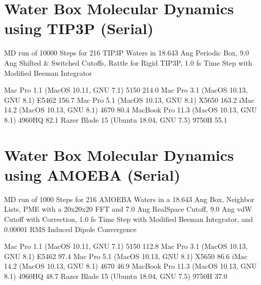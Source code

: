 \documentclass[letterpaper,11pt,english]{sphinxmanual}
\begin{document}
\section{Water Box Molecular Dynamics using TIP3P (Serial)}
\label{\detokenize{text/benchmarks:water-box-molecular-dynamics-using-tip3p-serial}}
MD run of 10000 Steps for 216 TIP3P Waters in 18.643 Ang Periodic Box, 9.0 Ang Shifted \& Switched Cutoffs, Rattle for Rigid TIP3P, 1.0 fs Time Step with Modified Beeman Integrator


\begin{sphinxVerbatim}[commandchars=\\\{\}]
Mac Pro 1.1 (MacOS 10.11, GNU 7.1)             5150               214.0
Mac Pro 3.1 (MacOS 10.13, GNU 8.1)            E5462               156.7
Mac Pro 5.1 (MacOS 10.13, GNU 8.1)            X5650               163.2
iMac 14.2 (MacOS 10.13, GNU 8.1)               4670                80.4
MacBook Pro 11.3 (MacOS 10.13, GNU 8.1)      4960HQ                82.1
Razer Blade 15 (Ubuntu 18.04, GNU 7.5)        9750H                55.1
\end{sphinxVerbatim}


\section{Water Box Molecular Dynamics using AMOEBA (Serial)}
\label{\detokenize{text/benchmarks:water-box-molecular-dynamics-using-amoeba-serial}}
MD run of 1000 Steps for 216 AMOEBA Waters in a 18.643 Ang Box, Neighbor Lists, PME with a 20x20x20 FFT and 7.0 Ang Real\sphinxhyphen{}Space Cutoff, 9.0 Ang vdW Cutoff with Correction, 1.0 fs Time Step with Modified Beeman Integrator, and 0.00001 RMS Induced Dipole Convergence


\begin{sphinxVerbatim}[commandchars=\\\{\}]
Mac Pro 1.1 (MacOS 10.11, GNU 7.1)             5150               112.8
Mac Pro 3.1 (MacOS 10.13, GNU 8.1)            E5462                97.4
Mac Pro 5.1 (MacOS 10.13, GNU 8.1)            X5650                86.6
iMac 14.2 (MacOS 10.13, GNU 8.1)               4670                46.9
MacBook Pro 11.3 (MacOS 10.13, GNU 8.1)      4960HQ                48.7
Razer Blade 15 (Ubuntu 18.04, GNU 7.5)        9750H                37.0
\end{sphinxVerbatim}
\end{document}
